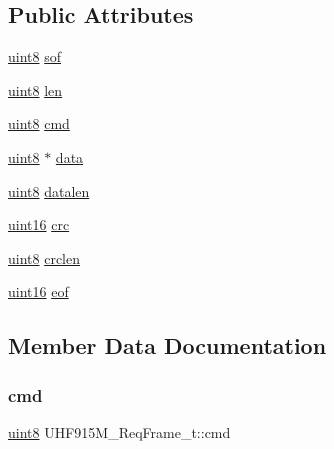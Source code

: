 \subsection*{Public Attributes}
\begin{DoxyCompactItemize}
\item 
\mbox{\hyperlink{m900dll_8h_adde6aaee8457bee49c2a92621fe22b79}{uint8}} \mbox{\hyperlink{struct_u_h_f915_m___req_frame__t_a5cd3171065060dd03f20d0f11039036e}{sof}}
\item 
\mbox{\hyperlink{m900dll_8h_adde6aaee8457bee49c2a92621fe22b79}{uint8}} \mbox{\hyperlink{struct_u_h_f915_m___req_frame__t_a977a9fcf3871acb4dc7e99dc0c740010}{len}}
\item 
\mbox{\hyperlink{m900dll_8h_adde6aaee8457bee49c2a92621fe22b79}{uint8}} \mbox{\hyperlink{struct_u_h_f915_m___req_frame__t_a36085022f48102264a60e19d89f778d1}{cmd}}
\item 
\mbox{\hyperlink{m900dll_8h_adde6aaee8457bee49c2a92621fe22b79}{uint8}} $\ast$ \mbox{\hyperlink{struct_u_h_f915_m___req_frame__t_aa2b4acab2b1c52feaba93326899ac44f}{data}}
\item 
\mbox{\hyperlink{m900dll_8h_adde6aaee8457bee49c2a92621fe22b79}{uint8}} \mbox{\hyperlink{struct_u_h_f915_m___req_frame__t_ab96d1d156bfe25da3c983f8137700b7a}{datalen}}
\item 
\mbox{\hyperlink{m900dll_8h_a05f6b0ae8f6a6e135b0e290c25fe0e4e}{uint16}} \mbox{\hyperlink{struct_u_h_f915_m___req_frame__t_af3acdc8615efe22938fcefa9a4fda674}{crc}}
\item 
\mbox{\hyperlink{m900dll_8h_adde6aaee8457bee49c2a92621fe22b79}{uint8}} \mbox{\hyperlink{struct_u_h_f915_m___req_frame__t_a966cf5ad8b1d7e13ec473c48c7edb086}{crclen}}
\item 
\mbox{\hyperlink{m900dll_8h_a05f6b0ae8f6a6e135b0e290c25fe0e4e}{uint16}} \mbox{\hyperlink{struct_u_h_f915_m___req_frame__t_afa020a84121162bd5b9d5ad2fa351345}{eof}}
\end{DoxyCompactItemize}


\subsection{Member Data Documentation}
\mbox{\label{struct_u_h_f915_m___req_frame__t_a36085022f48102264a60e19d89f778d1}} 
\subsubsection{\texorpdfstring{cmd}{cmd}}
{\footnotesize\ttfamily \mbox{\hyperlink{m900dll_8h_adde6aaee8457bee49c2a92621fe22b79}{uint8}} U\+H\+F915\+M\+\_\+\+Req\+Frame\+\_\+t\+::cmd}

